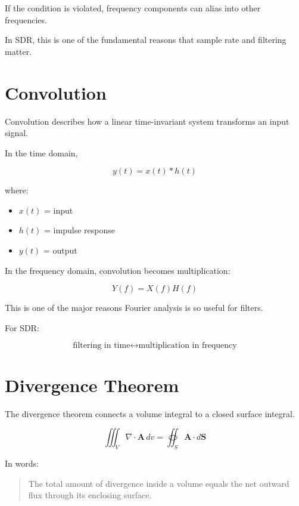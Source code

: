 \documentclass[11pt]{article}
\newcommand{\vect}[1]{\mathbf{#1}}
\begin{document}
If the condition is violated, frequency components can alias into other frequencies.

In SDR, this is one of the fundamental reasons that sample rate and filtering matter.



\section{Convolution}

Convolution describes how a linear time-invariant system transforms an input signal.

In the time domain,

\[
\boxed{
y(t)
=
x(t)*h(t)
}
\]

where:

\begin{itemize}
    \item $x(t)$ = input
    \item $h(t)$ = impulse response
    \item $y(t)$ = output
\end{itemize}

In the frequency domain, convolution becomes multiplication:

\[
\boxed{
Y(f)
=
X(f)H(f)
}
\]

This is one of the major reasons Fourier analysis is so useful for filters.

For SDR:

\[
\boxed{
\text{filtering in time}
\longleftrightarrow
\text{multiplication in frequency}
}
\]



\section{Divergence Theorem}

The divergence theorem connects a volume integral to a closed surface integral.

\[
\boxed{
\iiint_V
\nabla\cdot\vect{A}\,dv
=
\oiint_S
\vect{A}\cdot d\vect{S}
}
\]

In words:

\begin{quote}
The total amount of divergence inside a volume equals the net outward flux through its enclosing surface.
\end{quote}
\end{document}
